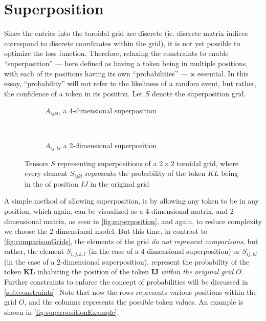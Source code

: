 
\section{Superposition}%
\label{sec:superposition}
Since the entries into the toroidal grid are discrete (ie. discrete matrix indices correspond to discrete coordinates within the grid), it is not yet possible to optimize the loss function. Therefore, relaxing the constraints to enable ``superposition'' --- here defined as having a token being in multiple positions, with each of its positions having its own ``probabilities'' --- is essential. In this essay, ``probability'' will not refer to the likeliness of a random event, but rather, the confidence of a token in its posiiton. Let $S$ denote the superposition grid.
\begin{figure}[htpb]
    \centering
    \begin{subfigure}[t]{0.5\textwidth}
    \begin{center}
    \end{center}
    \caption{$A_{ijkl}$, a 4-dimensional superposition}
    \end{subfigure}%
    ~
    \begin{subfigure}[t]{0.5\textwidth}
    \begin{center}
    \end{center}
    \caption{$A_{ij,kl}$ a 2-dimensional superposition}
    \end{subfigure}

    \caption{Tensors $S$ representing superpositions of a $2\times 2$ toroidal grid, where every element $S_{ijkl}$ represents the probability of the token $KL$ being in the of position $IJ$ in the original grid}%
    \label{fig:superposition}
\end{figure}

A simple method of allowing superposition, is by allowing any token to be in any position, which again, can be visualized as a 4-dimensional matrix, and 2-dimensional matrix, as seen in \autoref{fig:superposition}, and again, to reduce complexity we choose the 2-dimensional model. But this time, in contrast to \autoref{fig:comparisonGrids}, the elements of the grid \emph{do not represent comparisons}, but rather, the element $S_{i,j,k,l}$ (in the case of a 4-dimensional superposition) or $S_{ij,kl}$ (in the case of a 2-dimensional superposition), represent the probability of the token $\bm{KL}$ inhabiting the position of the token $\bm{IJ}$ \emph{within the original grid $O$}. Further constraints to enforce the concept of probabilities will be discussed in \autoref{sub:constraints}. Note that now the rows represents various positions within the grid $O$, and the columns represents the possible token values. An example is shown in \autoref{fig:superpositionExample}.


